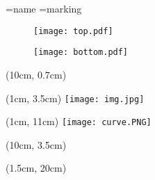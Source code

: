 \documentclass[a4paper, 12pt, onecolumn]{book}
\begin{document}
\thispagestyle{empty}										%


\name=name
\marking=marking
\newcommand{\path}{}

\begin{figure}[t!]
	\texttt{[image: top.pdf]}
\end{figure}


\begin{figure}[b!]
	\texttt{[image: bottom.pdf]}
\end{figure} 

\begin{textblock*}{10cm}(10cm, 0.7cm) 	%
	\centering
  {\fontsize{30}{0} \selectfont \textbf{ \name }}
\end{textblock*}

\begin{textblock*}{7cm}(1cm, 3.5cm)
	\texttt{[image: img.jpg]}
\end{textblock*}

\begin{textblock*}{7cm}(1cm, 11cm)
	\texttt{[image: curve.PNG]}
\end{textblock*}

\setlength{\arrayrulewidth}{0.3mm}
\setlength{\extrarowheight}{0.3cm}

\begin{textblock*}{11cm}(10cm, 3.5cm) 												%
{
	
}
\end{textblock*}

\setlength{\arrayrulewidth}{0.3mm}
\setlength{\extrarowheight}{1mm}

\begin{textblock*}{18cm}(1.5cm, 20cm) 								%
	\centering
	{
		
	}
\end{textblock*}
\end{document}

